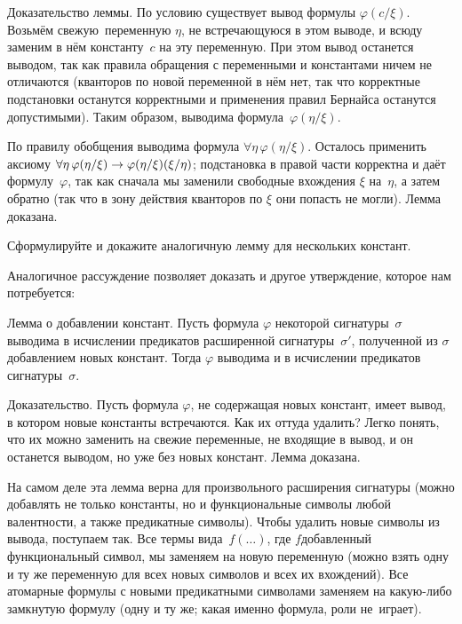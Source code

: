 Доказательство леммы. По условию существует вывод формулы
$\varphi(c/\xi)$. Возьмём  свежую\ переменную $\eta$, не
встречающуюся в этом выводе, и всюду заменим в нём константу~$c$
на эту переменную. При этом вывод останется выводом, так как
правила обращения с переменными и константами ничем не
отличаются (кванторов по новой переменной в нём нет, так что
корректные подстановки останутся корректными и применения
правил Бернайса останутся допустимыми). Таким образом, выводима
формула~$\varphi(\eta/\xi)$.

По правилу обобщения выводима формула
$\forall\eta\,\varphi(\eta/\xi)$. Осталось применить аксиому
$\forall\eta\,\varphi(\eta/\xi)\hm\to
\varphi(\eta/\xi)(\xi/\eta)$; подстановка в правой части
корректна и даёт формулу~$\varphi$, так как сначала мы заменили
свободные вхождения $\xi$ на~$\eta$, а затем обратно (так что в
зону действия кванторов по $\xi$ они попасть не могли). Лемма
доказана.

\begin{problem}
Сформулируйте и докажите аналогичную лемму для нескольких констант.
\end{problem}

Аналогичное рассуждение позволяет доказать и другое утверждение,
которое нам потребуется:

\textsf{Лемма о добавлении констант}.%
Пусть формула $\varphi$
некоторой сигнатуры~$\sigma$ выводима в исчислении предикатов
расширенной сигнатуры~$\sigma'$, полученной из $\sigma$
добавлением новых констант. Тогда $\varphi$ выводима и в
исчислении предикатов сигнатуры~$\sigma$.
        \label{lemma-adding-constants}%

Доказательство. Пусть формула $\varphi$, не содержащая новых
констант, имеет вывод, в котором новые константы встречаются.
Как их оттуда удалить? Легко понять, что их можно заменить на
свежие переменные, не входящие в вывод, и он останется выводом,
но уже без новых констант. Лемма доказана.

На самом деле эта лемма верна для произвольного расширения
сигнатуры (можно добавлять не только константы, но и
функциональные символы любой валентности, а также предикатные
символы). Чтобы удалить новые символы из вывода, поступаем так.
Все термы вида~$f(\ldots)$, где $f$\т добавленный функциональный
символ, мы заменяем на новую переменную (можно взять одну и ту
же переменную для всех новых символов и всех их вхождений). Все
атомарные формулы с новыми предикатными символами заменяем на
какую-либо замкнутую формулу (одну и ту же; какая именно
формула, роли не~играет).

